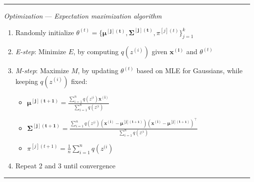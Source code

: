 {\color{lightgray}\hrule height 0.001mm}

\emph{Optimization} --- \emph{Expectation maximization algorithm}
\begin{enumerate}
    \item Randomly initialize $\theta^{(t)} = \{ \boldsymbol{\mu^{[j](t)}}, \boldsymbol{\Sigma^{[j](t)}}, \pi^{[j](t)} \}_{j=1}^k$
    \item \emph{E-step}: Minimize $E$, by computing $q(z^{(i)})$ given $\boldsymbol{x^{(i)}}$ and $\theta^{(t)}$
    \item \emph{M-step}: Maximize $M$, by updating $\theta^{(t)}$ based on MLE for Gaussians, while keeping $q(z^{(i)})$ fixed:
    \begin{itemize}
        \item $\boldsymbol{\mu^{[j](t+1)}} = \frac{ \sum_{i=1}^n q(z^{(i}) \boldsymbol{x^{(i)}} }{ \sum_{i=1}^n q(z^{(i}) }$
        \item $\boldsymbol{\Sigma^{[j](t+1)}} = \frac{ \sum_{i=1}^n q(z^{(i}) ( \boldsymbol{x^{(i)}} - \boldsymbol{\mu^{[j](t+1)}} )( \boldsymbol{x^{(i)}} - \boldsymbol{\mu^{[j](t+1)}} )^\intercal }{ \sum_{i=1}^n q(z^{(i}) }$
        \item $\pi^{[j](t+1)} = \frac{1}{n} \sum_{i=1}^n q(z^{(i})$
    \end{itemize}
    \item Repeat 2 and 3 until convergence
\end{enumerate}

{\color{lightgray}\hrule height 0.001mm}

